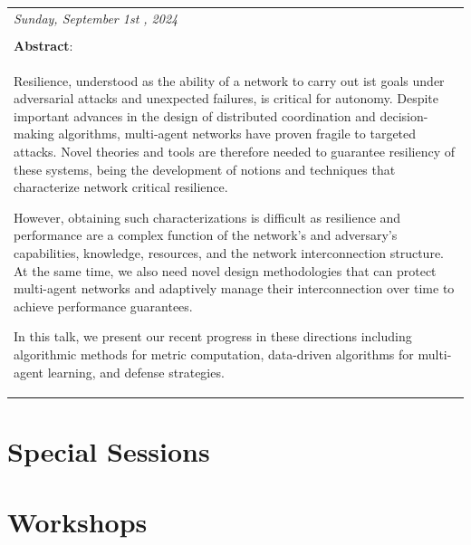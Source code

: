 \documentclass[
	openany, %
	parskip=full, %
	12pt, %
	a4paper, %
]{conferencebooklet} %
\begin{document}
\begin{table}[h!]
{\begin{tabular}{p{75mm}}
            \large \textit{Sunday, September 1st , 2024} \\ \\
            \textbf{Abstract}: \\
            Resilience, understood as the ability of a network to carry out ist goals under adversarial attacks and unexpected failures, is critical for autonomy. Despite important advances in the design of distributed coordination and decision-making algorithms, multi-agent networks have proven fragile to targeted attacks. Novel theories and tools are therefore needed to guarantee resiliency of these systems, being the development of notions and techniques that characterize network critical resilience. 
            
            However, obtaining such characterizations is difficult as resilience and performance are a complex function of the network’s and adversary’s capabilities, knowledge, resources, and the network interconnection structure. At the same time, we also need novel design methodologies that can protect multi-agent networks and adaptively manage their interconnection over time to achieve performance guarantees.  
            
            In this talk, we present our recent progress in these directions including algorithmic methods for metric computation, data-driven algorithms for multi-agent learning, and defense strategies.
        \end{tabular}
    }
\end{table}

\chapter{Special Sessions}

\begin{multicols*}{2}
    
\end{multicols*}

\chapter{Workshops}
\end{document}

